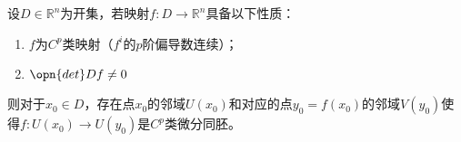 
\begin{issues}
\issueDraft
\end{issues}
\begin{theorem}{}
设$D\in \mathbb R^n$为开集，若映射$f:D\rightarrow \mathbb R^n$具备以下性质：
\begin{enumerate}
\item $f$为$C^p$类映射（$f^i$的$p$阶偏导数连续）；
\item $\opn{det}Df\neq 0$
\end{enumerate}
则对于$x_0\in D$，存在点$x_0$的邻域$U(x_0)$和对应的点$y_0=f(x_0)$的邻域$V(y_0)$使得$f:U(x_0)\rightarrow U(y_0)$是$C^p$类微分同胚。

\end{theorem}


